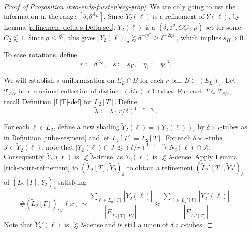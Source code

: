 \documentclass{amsart}
\numberwithin{equation}{section}
\newcommand{\de}{\delta}
\newcommand{\e}{\varepsilon}
\newcommand{\la}{\lambda}
\newcommand{\eps}{\eta}
\newcommand{\cT}{{\mathcal T}}
\begin{document}
\begin{proof}[Proof of Proposition \ref{two-ends-furstenberg-prop}]
We are only going to use the information in the range $[\de,\de^{A_H}]$.
Since $Y_2(\ell)$ is a refinement of $Y(\ell)$, by Lemma \ref{refinement-delta-s-Delta-set}, $Y_2(\ell)$ is a $(\de,\e^2,CC_2;\rho)$-set for some $C_2\lessapprox1$.
Since $\rho\leq\de^{\eta}$, this gives $|Y_2(\ell)|_\de\gtrapprox\de^{-\eta\e^2}\geq \de^{-2\eps\e^3}$, which implies $s_H>0$.



\smallskip

To ease notations, define
\begin{equation}
\label{parameters}
    r:=\de^{A_H}, \,\,\,\,\,s:=s_H,\,\,\,\,\,\eta_1:=\eps\e^3.
\end{equation}



\medskip





We will establish a uniformization on $E_{L}\cap B$ for each $r$-ball $B\subset(E_L)_r$. 
Let $\cT_{\de/r}$ be a maximal collection of distinct $(\de/r)\times1$-tubes. 
For each $T\in\cT_{\de/r}$, recall Definition \ref{L[T]-def} for $L_2[T]$. 
Define
\begin{equation}
\label{tilde-lambda}
    \tilde\la:=\la (r/\de)^{1-s-\eta_1}.
\end{equation}




For each $\ell\in L_2$, define a new shading  $\tilde Y_2(\ell) = (Y_2(\ell))_r$ by $\delta\times r$-tubes as in Definition \ref{tube-segment}  and let $\tilde L_2[T]=L_2[T]$. 
For each $\de\times r$-tube $J\subset \tilde Y_2(\ell)$, note that $|Y_2(\ell)\cap J|\lesssim (\de/r)^{1-s-\eta_1}|N_\de(\ell) \cap J|$.  
Consequently, $\tilde Y_2(\ell)$ is $\gtrapprox \tilde\la$-dense, as $Y_2(\ell)$ is $\gtrapprox \lambda$-dense. 
Apply Lemma \ref{rich-point-refinement} to $(\tilde L_2[T], \tilde Y_2)_\de$ to obtain a refinement $(\tilde L_2'[T], \tilde Y_2')_\de$ of $(\tilde L_2[T], \tilde Y_2)_\de$ satisfying 
\begin{equation}
    \#(\tilde L_2[T])_{\tilde Y_2'}(x)\sim\frac{\sum_{\ell\in \tilde L_2[T]}|\tilde Y_2(\ell)|}{|E_{\tilde L_2[T], \tilde Y_2'}|}\approx\frac{\sum_{\ell\in \tilde L_2'[T]}|\tilde Y_2'(\ell)|}{|E_{\tilde L_2'[T]}|}.
\end{equation}
Note that $\tilde Y_2'(\ell)$ is $\gtrapprox\tilde\la$-dense and is still a union of $\delta\times r$-tubes.


\end{proof}
\end{document}
